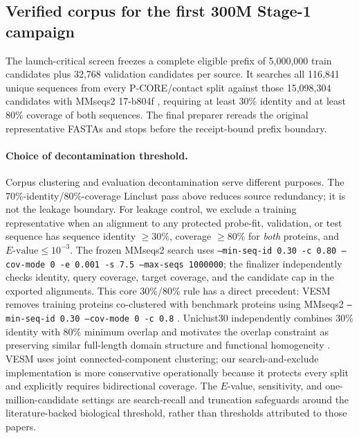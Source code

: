 \documentclass{article}
\newcommand{\code}[1]{\texttt{#1}}
\begin{document}
\subsection{Verified corpus for the first 300M Stage-1 campaign}

The launch-critical screen freezes a complete eligible prefix of 5,000,000
train candidates plus 32,768 validation candidates per source. It searches
all 116,841 unique sequences from every P-CORE/contact split against those
15,098,304 candidates with MMseqs2 17-b804f
\citep{steinegger2017mmseqs2}, requiring at least 30\% identity and at least 80\%
coverage of both sequences. The final preparer rereads the original
representative FASTAs and stops before the receipt-bound prefix boundary.

\paragraph{Choice of decontamination threshold.}
Corpus clustering and evaluation decontamination serve different purposes.
The 70\%-identity/80\%-coverage Linclust pass above reduces source redundancy;
it is not the leakage boundary. For leakage control, we exclude a training
representative when an alignment to any protected probe-fit, validation, or
test sequence has sequence identity $\geq 30\%$, coverage $\geq 80\%$ for
\emph{both} proteins, and $E\text{-value}\leq 10^{-3}$. The frozen MMseqs2
search uses \code{--min-seq-id 0.30 -c 0.80 --cov-mode 0 -e 0.001 -s 7.5
--max-seqs 1000000}; the finalizer independently checks identity, query
coverage, target coverage, and the candidate cap in the exported alignments.
This core 30\%/80\% rule has a direct precedent: VESM removes training proteins
co-clustered with benchmark proteins using MMseqs2
\code{--min-seq-id 0.30 --cov-mode 0 -c 0.8}
\citep{dinh2026vesm}. Uniclust30 independently combines 30\% identity with 80\%
minimum overlap and motivates the overlap constraint as preserving similar
full-length domain structure and functional homogeneity
\citep{mirdita2017uniclust}. VESM uses joint connected-component clustering;
our search-and-exclude implementation is more conservative operationally
because it protects every split and explicitly requires bidirectional
coverage. The $E$-value, sensitivity, and one-million-candidate settings are
search-recall and truncation safeguards around the literature-backed biological
threshold, rather than thresholds attributed to those papers.
\end{document}
